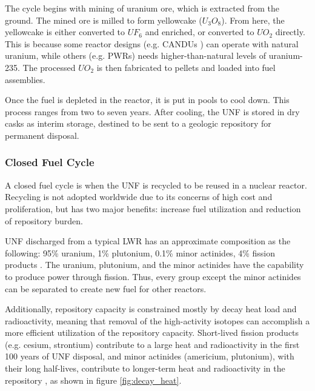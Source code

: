 The cycle begins with mining of uranium ore, which is extracted from the
ground. The mined ore is milled to form yellowcake ($U_3O_8$). From here,
the yellowcake is either converted to $UF_6$ and enriched, or converted
to $UO_2$ directly. This is because some reactor designs (e.g. \glspl{CANDU} \cite{torgerson_candu_2006})
can operate with natural uranium, while others (e.g. \glspl{PWR}) needs
higher-than-natural levels of uranium-235. The processed $UO_2$ is
then fabricated to pellets and loaded into fuel assemblies. 

Once the fuel is depleted in the reactor, it is put in pools to cool down.
This process ranges from two to seven years. After cooling, the \gls{UNF}
is stored in dry casks as interim storage, destined to be sent to a geologic repository
for permanent disposal.

\subsubsection{Closed Fuel Cycle}
A closed fuel cycle is when the \gls{UNF} is recycled to be reused
in a nuclear reactor. Recycling is not adopted worldwide due to
its concerns of high cost and proliferation, but has two major
benefits: increase fuel utilization and reduction of repository
burden. 

\gls{UNF} discharged from a typical \gls{LWR} has an approximate
composition as the following: 95\% uranium, 1\% plutonium, 0.1\%
minor actinides, 4\% fission products \cite{feiveson_spent_2011}.
The uranium, plutonium, and the minor actinides have the capability
to produce power through fission. Thus, every group except the
minor actinides can be separated to create new fuel for other reactors.

Additionally, repository capacity is constrained mostly by decay heat
load and radioactivity, meaning that removal of the high-activity
isotopes can accomplish a more efficient utilization of the repository
capacity. Short-lived fission products (e.g. cesium, strontium) contribute
to a large heat and radioactivity in the first 100 years of \gls{UNF} disposal,
and minor actinides (americium, plutonium), with their long half-lives,
contribute to longer-term heat and radioactivity in the repository \cite{wigeland_separations_2006},
as shown in figure \ref{fig:decay_heat}.


